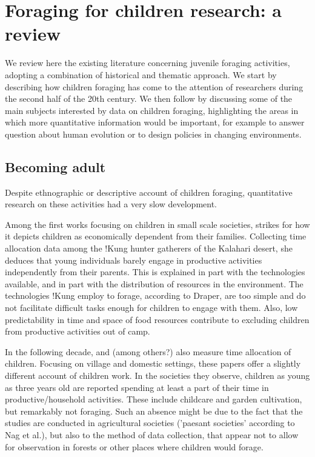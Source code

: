 \section{Foraging for children research: a review}

We review here the existing literature concerning juvenile foraging activities, adopting a combination of historical and thematic approach. We start by describing how children foraging has come to the attention of researchers during the second half of the 20th century. We then follow by discussing some of the main subjects interested by data on children foraging, highlighting the areas in which more quantitative information would be important, for example to answer question about human evolution or to design policies in changing environments.

\subsection{Becoming adult}

Despite ethnographic or descriptive account of children foraging, quantitative research on these activities had a very slow development. %

Among the first works focusing on children in small scale societies, \cite{lee_social_1976} strikes for how it depicts children as economically dependent from their families. Collecting time allocation data among the !Kung hunter gatherers of the Kalahari desert, she deduces that young individuals barely engage in productive activities independently from their parents. This is explained in part with the technologies available, and in part with the distribution of resources in the environment. The technologies !Kung employ to forage, according to Draper, are too simple and do not facilitate difficult tasks enough for children to engage with them. Also, low predictability in time and space of food resources contribute to excluding children from productive activities out of camp. 

In the following decade, \cite{nag_anthropological_1978} and \cite{munroe_childrens_1984} (among others?) also measure time allocation of children. Focusing on village and domestic settings, these papers offer a slightly different account of children work. In the societies they observe, children as young as three years old are reported spending at least a part of their time in productive/household activities. These include childcare and garden cultivation, but remarkably not foraging. Such an absence might be due to the fact that the studies are conducted in agricultural societies ('paesant societies' according to Nag et al.), but also to the method of data collection, that appear not to allow for observation in forests or other places where children would forage.

